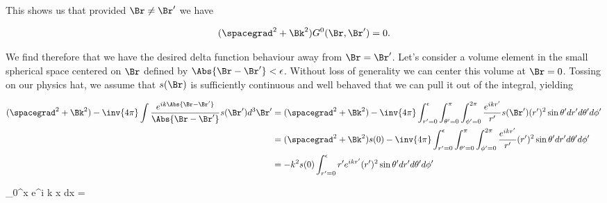 This shows us that provided $\Br \ne \Br'$ we have

\begin{equation}\label{eqn:helmholtzGreens:n}
(\spacegrad^2 + \Bk^2) G^0(\Br, \Br') = 0.
\end{equation}

We find therefore that we have the desired delta function behaviour away from $\Br = \Br'$.  Let's consider a volume element in the small spherical space centered on $\Br$ defined by $\Abs{\Br - \Br'} < \epsilon$.  Without loss of generality we can center this volume at $\Br = 0$.  Tossing on our physics hat, we assume that $s(\Br)$ is sufficiently continuous and well behaved that we can pull it out of the integral, yielding

\begin{align*}
(\spacegrad^2 + \Bk^2)
- \inv{4 \pi} 
\int 
\frac{e^{i k \Abs{\Br - \Br'}} }{\Abs{\Br - \Br'}}
s(\Br') d^3 \Br'
&=
(\spacegrad^2 + \Bk^2)
- \inv{4 \pi} 
\int_{r' = 0}^\epsilon
\int_{\theta' = 0}^\pi
\int_{\phi' = 0}^{2 \pi}
\frac{e^{i k r'} }{r'}
s(\Br') 
(r')^2 \sin\theta' dr' d\theta' d\phi' \\
&=
(\spacegrad^2 + \Bk^2)
s(0) 
- \inv{4 \pi} 
\int_{r' = 0}^\epsilon
\int_{\theta' = 0}^\pi
\int_{\phi' = 0}^{2 \pi}
\frac{e^{i k r'} }{r'}
(r')^2 \sin\theta' dr' d\theta' d\phi' \\
&=
-k^2
s(0) 
\int_{r' = 0}^\epsilon
r' e^{i k r'} 
(r')^2 \sin\theta' dr' d\theta' d\phi' \\
\end{align*}

\int_0^\epsilon x e^{i k x} dx
=

\EndArticle
